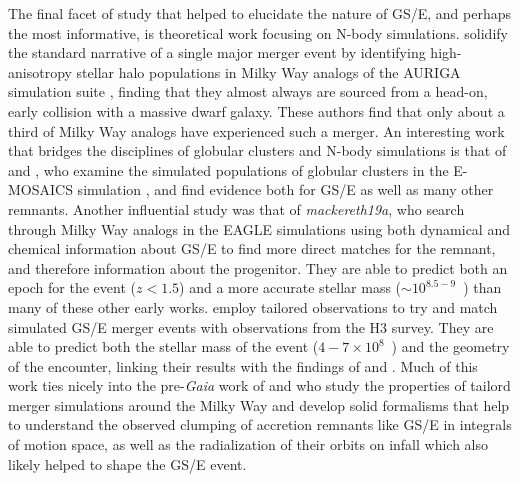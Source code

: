 The final facet of study that helped to elucidate the nature of GS/E, and perhaps the most informative, is theoretical work focusing on N-body simulations. \textcite{fattahi19} solidify the standard narrative of a single major merger event by identifying high-anisotropy stellar halo populations in Milky Way analogs of the AURIGA simulation suite \parencite{grand17}, finding that they almost always are sourced from a head-on, early collision with a massive dwarf galaxy. These authors find that only about a third of Milky Way analogs have experienced such a merger. An interesting work that bridges the disciplines of globular clusters and N-body simulations is that of \textcite{kruijssen19b} and \textcite{kruijssen20}, who examine the simulated populations of globular clusters in the E-MOSAICS simulation \parencite{kruijssen19a}, and find evidence both for GS/E as well as many other remnants. Another influential study was that of \textit{mackereth19a}, who search through Milky Way analogs in the EAGLE simulations using both dynamical and chemical information about GS/E to find more direct matches for the remnant, and therefore information about the progenitor. They are able to predict both an epoch for the event ($z < 1.5$) and a more accurate stellar mass ($\sim 10^{8.5-9}$~\Msun) than many of these other early works. \textcite{naidu21} employ tailored observations to try and match simulated GS/E merger events with observations from the H3 survey. They are able to predict both the stellar mass of the event ($4-7 \times 10^{8}$~\Msun) and the geometry of the encounter, linking their results with the findings of \textcite{simion19} and \textcite{iorio19}. Much of this work ties nicely into the pre-\textit{Gaia} work of \textcite{amorisco17} and \textcite{jean-baptiste17} who study the properties of tailord merger simulations around the Milky Way and develop solid formalisms that help to understand the observed clumping of accretion remnants like GS/E in integrals of motion space, as well as the radialization of their orbits on infall which also likely helped to shape the GS/E event.


